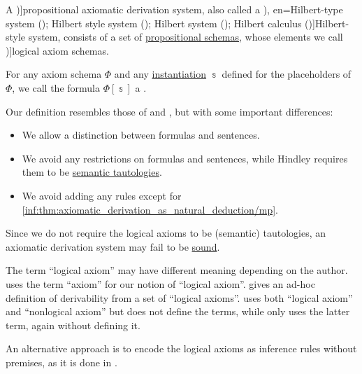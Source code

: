 \begin{definition}\label{def:axiomatic_derivation_system}\mimprovised
  A \term[en=axiomatic system (\cite[6D1]{Hindley1997STT})]{propositional axiomatic derivation system}, also called a \term[ru=исчисление высказываний гильбертовского типа (\cite[35]{Герасимов2011Вычислимость}), en=Hilbert-type system (\cite[80]{Smullyan1995FOL}); Hilbert style system (\cite[6D1]{Hindley1997STT}); Hilbert system (\cite[33]{TroelstraSchwichtenberg2000Proofs}); Hilbert calculus (\cite[103]{Mimram2020Types})]{Hilbert-style system}, consists of a set of \hyperref[def:propositional_formula_schema]{propositional schemas}, whose elements we call \term[en=axiom schema (\cite[80]{Smullyan1995FOL})]{logical axiom schemas}.

  For any axiom schema \( \Phi \) and any \hyperref[def:propositional_schema_instantiation]{instantiation} \( \Bbbs \) defined for the placeholders of \( \Phi \), we call the formula \( \Phi[\Bbbs] \) a .
\end{definition}
\begin{comments}
  \item Our definition resembles those of  and , but with some important differences:
  \begin{itemize}
    \item We allow a distinction between formulas and sentences.
    \item We avoid any restrictions on formulas and sentences, while Hindley requires them to be \hyperref[def:propositional_tautology]{semantic tautologies}.
    \item We avoid adding any rules except for \ref{inf:thm:axiomatic_derivation_as_natural_deduction/mp}.
  \end{itemize}

  \item Since we do not require the logical axioms to be (semantic) tautologies, an axiomatic derivation system may fail to be \hyperref[def:logical_framework/soundness]{sound}.

  \item The term \enquote{logical axiom} may have different meaning depending on the author.  uses the term \enquote{axiom} for our notion of \enquote{logical axiom}.  gives an ad-hoc definition of derivability from a set of \enquote{logical axioms}.  uses both \enquote{logical axiom} and \enquote{nonlogical axiom} but does not define the terms, while  only uses the latter term, again without defining it.

  \item An alternative approach is to encode the logical axioms as inference rules without premises, as it is done in \cite[103]{Mimram2020Types}.
\end{comments}

